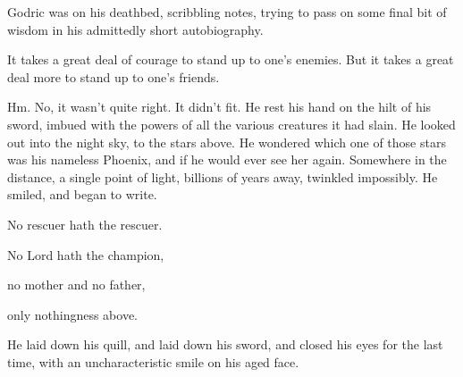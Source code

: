Godric was on his deathbed, scribbling notes, trying to pass on some final bit of wisdom in his admittedly short autobiography.
\begin{writtenNote}
It takes a great deal of courage to stand up to one’s enemies. But it takes a great deal more to stand up to one’s friends.
\end{writtenNote}
Hm. No, it wasn’t quite right. It didn’t fit. He rest his hand on the hilt of his sword, imbued with the powers of all the various creatures it had slain. He looked out into the night sky, to the stars above. He wondered which one of those stars was his nameless Phoenix, and if he would ever see her again. Somewhere in the distance, a single point of light, billions of years away, twinkled impossibly.
\SmallVSpace
He smiled, and began to write.
\begin{writtenNote}\indent
No rescuer hath the rescuer.

No Lord hath the champion,

no mother and no father,

only nothingness above.
\end{writtenNote}
He laid down his quill, and laid down his sword, and closed his eyes for the last time, with an uncharacteristic smile on his aged face.